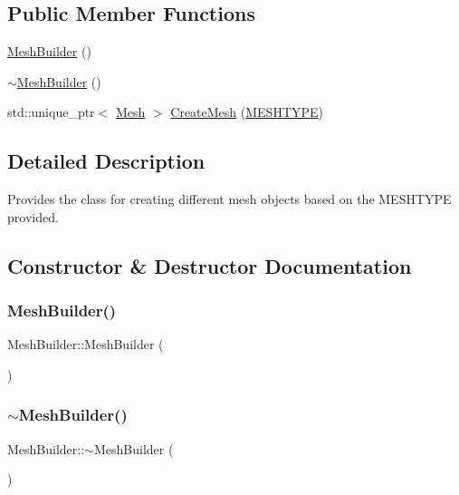 \subsection*{Public Member Functions}
\begin{DoxyCompactItemize}
\item 
\mbox{\hyperlink{class_mesh_builder_a13fe22fd14a85f789dc9d7d4a8d2419d}{Mesh\+Builder}} ()
\item 
\mbox{\hyperlink{class_mesh_builder_ac409c889085089b34c5297cf7150f49d}{$\sim$\+Mesh\+Builder}} ()
\item 
std\+::unique\+\_\+ptr$<$ \mbox{\hyperlink{class_mesh}{Mesh}} $>$ \mbox{\hyperlink{class_mesh_builder_a51d89fe601df06e63112c70416ac03dc}{Create\+Mesh}} (\mbox{\hyperlink{_mesh_builder_interface_8h_ad6436347ddb93aed826a19081b53dd61}{M\+E\+S\+H\+T\+Y\+PE}})
\end{DoxyCompactItemize}


\subsection{Detailed Description}
Provides the class for creating different mesh objects based on the M\+E\+S\+H\+T\+Y\+PE provided. 

\subsection{Constructor \& Destructor Documentation}
\mbox{\label{class_mesh_builder_a13fe22fd14a85f789dc9d7d4a8d2419d}} 
\subsubsection{\texorpdfstring{MeshBuilder()}{MeshBuilder()}}
{\footnotesize\ttfamily Mesh\+Builder\+::\+Mesh\+Builder (\begin{DoxyParamCaption}{ }\end{DoxyParamCaption})}

\mbox{\label{class_mesh_builder_ac409c889085089b34c5297cf7150f49d}} 
\subsubsection{\texorpdfstring{$\sim$MeshBuilder()}{~MeshBuilder()}}
{\footnotesize\ttfamily Mesh\+Builder\+::$\sim$\+Mesh\+Builder (\begin{DoxyParamCaption}{ }\end{DoxyParamCaption})}



